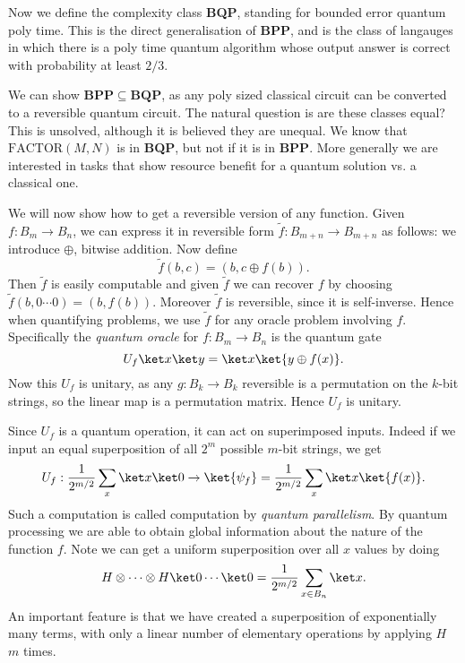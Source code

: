 \documentclass[12pt]{article}
\begin{document}
Now we define the complexity class \textbf{BQP}, standing for bounded error quantum poly time. This is the direct generalisation of \textbf{BPP}, and is the class of langauges in which there is a poly time quantum algorithm whose output answer is correct with probability at least $2/3$.

We can show $\mathbf{BPP} \subseteq \mathbf{BQP}$, as any poly sized classical circuit can be converted to a reversible quantum circuit. The natural question is are these classes equal? This is unsolved, although it is believed they are unequal. We know that $\mathrm{FACTOR}(M, N)$ is in \textbf{BQP}, but not if it is in \textbf{BPP}. More generally we are interested in tasks that show resource benefit for a quantum solution vs. a classical one.

We will now show how to get a reversible version of any function. Given $f : B_m \to B_n$, we can express it in reversible form $\tilde f : B_{m+n} \to B_{m+n}$ as follows: we introduce $\oplus$, bitwise addition. Now define
\[
\tilde f(b, c) = (b, c \oplus f(b)).
\]
Then $\tilde f$ is easily computable and given $\tilde f$ we can recover $f$ by choosing $\tilde f(b, 0\cdots0) = (b, f(b))$. Moreover $\tilde f$ is reversible, since it is self-inverse. Hence when quantifying problems, we use $\tilde f$ for any oracle problem involving $f$. Specifically the \emph{quantum oracle} for $f : B_m \to B_n$ is the quantum gate
\[
	U_f \ket x \ket y = \ket x \ket{y \oplus f(x)}.
\]
Now this $U_f$ is unitary, as any $g : B_k \to B_k$ reversible is a permutation on the $k$-bit strings, so the linear map is a permutation matrix. Hence $U_f$ is unitary.

Since $U_f$ is a quantum operation, it can act on superimposed inputs. Indeed if we input an equal superposition of all $2^m$ possible $m$-bit strings, we get
\[
	U_f : \frac{1}{2^{m/2}} \sum_x \ket x \ket 0 \to \ket{\psi_f} = \frac{1}{2^{m/2}} \sum_x \ket x \ket{f(x)}.
\]
Such a computation is called computation by \emph{quantum parallelism}. By quantum processing we are able to obtain global information about the nature of the function $f$. Note we can get a uniform superposition over all $x$ values by doing
\[
H \otimes \cdots \otimes H \ket 0 \cdots \ket 0 = \frac{1}{2^{m/2}} \sum_{x \in B_n} \ket x.
\]
An important feature is that we have created a superposition of exponentially many terms, with only a linear number of elementary operations by applying $H$ $m$ times.

\end{document}
